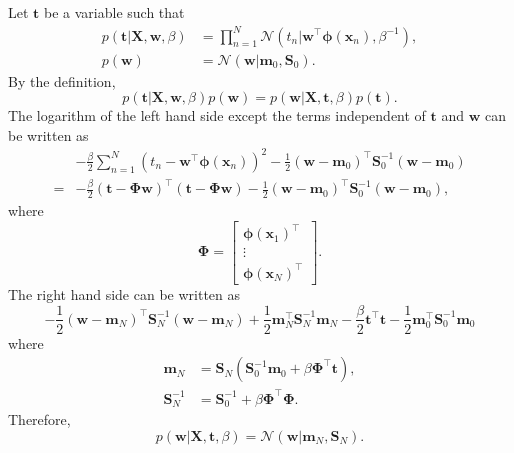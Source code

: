 \subsection{}
\label{3.7}
Let $\mathbf{t}$ be a variable such that
%
\begin{equation}
\begin{aligned}
p(\mathbf{t} | \mathbf{X}, \mathbf{w}, \beta)
&=
\prod_{n = 1}^{N}
\mathcal{N}
\left(
	t_n
	|
	\mathbf{w} ^ \intercal
	\bm{\phi}(\mathbf{x}_n),
	\beta ^ {- 1}
\right),
\\
p(\mathbf{w})
&=
\mathcal{N}
(\mathbf{w} | \mathbf{m}_0, \mathbf{S}_0).
\end{aligned}
\end{equation}
%
By the definition,
%
\begin{equation}
p(\mathbf{t} | \mathbf{X}, \mathbf{w}, \beta)
p(\mathbf{w})
=
p(\mathbf{w} | \mathbf{X}, \mathbf{t}, \beta)
p(\mathbf{t}).
\end{equation}
%
The logarithm of the left hand side except the terms independent of $\mathbf{t}$ and $\mathbf{w}$ can be written as
%
\begin{equation}
\begin{aligned}
&-
\frac{\beta}{2}
\sum_{n = 1}^{N}
\left(
	t_n
	-
	\mathbf{w} ^ \intercal
	\bm{\phi}(\mathbf{x}_n)
\right) ^ 2
-
\frac{1}{2}
(\mathbf{w} - \mathbf{m}_0) ^ \intercal
\mathbf{S}_0 ^ {- 1}
(\mathbf{w} - \mathbf{m}_0)
\\
=&
-
\frac{\beta}{2}
(\mathbf{t} - \bm{\Phi} \mathbf{w}) ^ \intercal
(\mathbf{t} - \bm{\Phi} \mathbf{w})
-
\frac{1}{2}
(\mathbf{w} - \mathbf{m}_0) ^ \intercal
\mathbf{S}_0 ^ {- 1}
(\mathbf{w} - \mathbf{m}_0),
\end{aligned}
\end{equation}
%
where
%
\[
\bm{\Phi}
=
\begin{bmatrix}
\bm{\phi} (\mathbf{x}_1) ^ \intercal 
\\
\vdots 
\\
\bm{\phi} (\mathbf{x}_N) ^ \intercal
\end{bmatrix}
.
\]
%
The right hand side can be written as
%
\begin{equation}
-
\frac{1}{2}
\left(
	\mathbf{w}
	-
	\mathbf{m}_N
\right) ^ \intercal
\mathbf{S}_N ^ {- 1}
\left(
	\mathbf{w}
	-
	\mathbf{m}_N
\right)
+
\frac{1}{2}
\mathbf{m}_N ^ \intercal
\mathbf{S}_N ^ {- 1}
\mathbf{m}_N
-
\frac{\beta}{2}
\mathbf{t} ^ \intercal
\mathbf{t}
-
\frac{1}{2}
\mathbf{m}_0 ^ \intercal
\mathbf{S}_0 ^ {- 1}
\mathbf{m}_0
\end{equation}
%
where
%
\begin{equation}
\begin{aligned}
\mathbf{m}_N
&=
\mathbf{S}_N
\left(
	\mathbf{S}_0 ^ {- 1}
	\mathbf{m}_0
	+
	\beta
	\bm{\Phi} ^ \intercal
	\mathbf{t}
\right),
\\
\mathbf{S}_N ^ {- 1}
&=
\mathbf{S}_0 ^ {- 1}
+
\beta
\bm{\Phi} ^ \intercal
\bm{\Phi}.
\end{aligned}
\end{equation}
%
Therefore,
%
\begin{equation}
p(\mathbf{w} | \mathbf{X}, \mathbf{t}, \beta)
=
\mathcal{N}
(\mathbf{w} | \mathbf{m}_N, \mathbf{S}_N).
\end{equation}
%


